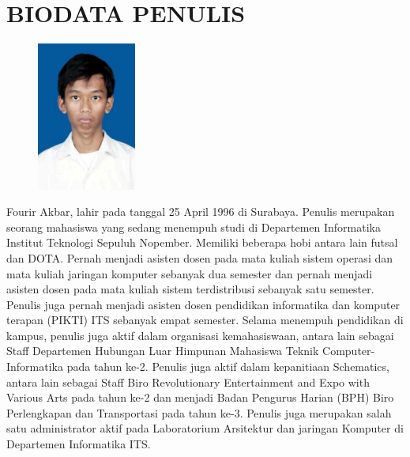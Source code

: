 \backmatter %
	\chapter{BIODATA PENULIS}
		\begin{figure}
			\includegraphics[width=0.29\textwidth]{images/cover/pic}
		\end{figure}
		Fourir Akbar, lahir pada tanggal 25 April 1996 di Surabaya. Penulis merupakan seorang mahasiswa yang sedang menempuh studi di Departemen Informatika Institut Teknologi Sepuluh Nopember. Memiliki beberapa hobi antara lain futsal dan DOTA. Pernah menjadi asisten dosen pada mata kuliah sistem operasi dan mata kuliah jaringan komputer sebanyak dua semester dan pernah menjadi asisten dosen pada mata kuliah sistem terdistribusi sebanyak satu semester. Penulis juga pernah menjadi asisten dosen pendidikan informatika dan komputer terapan (PIKTI) ITS sebanyak empat semester. Selama menempuh pendidikan di kampus, penulis juga aktif dalam organisasi kemahasiswaan, antara lain sebagai Staff Departemen Hubungan Luar Himpunan Mahasiswa Teknik Computer-Informatika pada tahun ke-2. Penulis juga aktif dalam kepanitiaan Schematics, antara lain sebagai Staff Biro Revolutionary Entertainment and Expo with Various Arts pada tahun ke-2 dan menjadi Badan Pengurus Harian (BPH) Biro Perlengkapan dan Transportasi pada tahun ke-3. Penulis juga merupakan salah satu administrator aktif pada Laboratorium Arsitektur dan jaringan Komputer di Departemen Informatika ITS.
